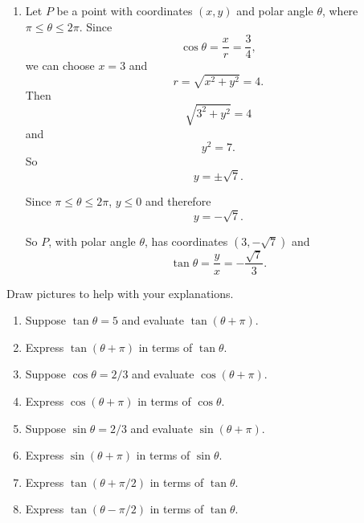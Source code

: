 \documentclass{ximera}
\begin{document}
\begin{question}
\begin{enumerate}
\item Let $P$ be a point with coordinates $(x,y)$ and polar angle $\theta$,  where $\pi \leq  \theta \leq 2\pi$. Since
\[
  \cos\theta = \frac{x}{r} = \frac{3}{4},
\]
we can choose $x=3$ and 
\[
  r = \sqrt{x^2 + y^2} = 4.
\]
Then
\[
    \sqrt{3^2 + y^2} = 4 
\]
and
\[
   y^2 = 7.
\]
So 
\[
   y=\pm \sqrt{7}.
\]

Since $\pi \leq  \theta \leq 2\pi$,  $y\leq 0$ and therefore
\[
  y = - \sqrt{7}.
\]

So $P$, with polar angle $\theta$, has coordinates $(3, -\sqrt{7})$ and
\[
  \tan\theta = \frac{y}{x} = - \frac{\sqrt{7}}{3}.
\]

\end{enumerate}
\end{question}



\begin{question} \label{Q89fegvVDE}
Draw pictures to help with your explanations.
\begin{enumerate}
\item Suppose $\tan \theta = 5$ and evaluate $\tan(\theta + \pi)$.

\item Express $\tan(\theta+\pi)$ in terms of $\tan \theta$.

\item Suppose $\cos \theta = 2/3$ and evaluate $\cos(\theta + \pi)$.

\item Express $\cos(\theta+\pi)$ in terms of $\cos \theta$.

\item Suppose $\sin \theta = 2/3$ and evaluate $\sin(\theta + \pi)$.

\item Express $\sin(\theta+\pi)$ in terms of $\sin \theta$.

\item Express $\tan(\theta+\pi/2)$ in terms of $\tan \theta$.

\item Express $\tan(\theta -\pi/2)$ in terms of $\tan \theta$.
\end{enumerate}
\end{question}
\end{document}
